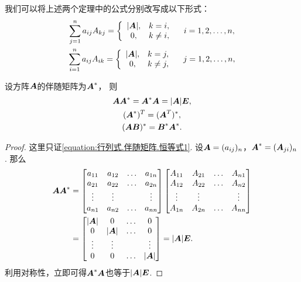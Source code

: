 我们可以将上述两个定理中的公式分别改写成以下形式：
\begin{gather}
	\sum_{j=1}^n a_{ij} A_{kj}
	= \left\{ \begin{array}{cl}
		\abs{\boldsymbol{A}}, & k = i, \\
		0, & k \neq i,
	\end{array} \right.
	\quad i=1,2,\dotsc,n, \\
	\sum_{i=1}^n a_{ij} A_{ik}
	= \left\{ \begin{array}{cl}
		\abs{\boldsymbol{A}}, & k = j, \\
		0, & k \neq j,
	\end{array} \right.
	\quad j=1,2,\dotsc,n,
\end{gather}

\begin{theorem}
设方阵\(\boldsymbol{A}\)的伴随矩阵为\(\boldsymbol{A}^*\)，
则\begin{gather}
	\boldsymbol{A} \boldsymbol{A}^* = \boldsymbol{A}^* \boldsymbol{A} = \abs{\boldsymbol{A}} \boldsymbol{E}, \label{equation:行列式.伴随矩阵.恒等式1} \\
	(\boldsymbol{A}^*)^T = (\boldsymbol{A}^T)^*, \label{equation:行列式.伴随矩阵.恒等式2} \\
	(\boldsymbol{A} \boldsymbol{B})^* = \boldsymbol{B}^* \boldsymbol{A}^*. \label{equation:行列式.伴随矩阵.恒等式3}
\end{gather}
\begin{proof}
这里只证\cref{equation:行列式.伴随矩阵.恒等式1}.
设\(\boldsymbol{A}=(a_{ij})_n\)，\(\boldsymbol{A}^*=(\boldsymbol{A}_{ji})_n\).
那么\begin{align*}
	\boldsymbol{A}\boldsymbol{A}^*
	&= \begin{bmatrix}
		a_{11} & a_{12} & \dots & a_{1n} \\
		a_{21} & a_{22} & \dots & a_{2n} \\
		\vdots & \vdots & & \vdots \\
		a_{n1} & a_{n2} & \dots & a_{nn} \\
	\end{bmatrix}
	\begin{bmatrix}
		A_{11} & A_{21} & \dots & A_{n1} \\
		A_{12} & A_{22} & \dots & A_{n2} \\
		\vdots & \vdots & & \vdots \\
		A_{1n} & A_{2n} & \dots & A_{nn}
	\end{bmatrix} \\
	&= \begin{bmatrix}
		\abs{\boldsymbol{A}} & 0 & \dots & 0 \\
		0 & \abs{\boldsymbol{A}} & \dots & 0 \\
		\vdots & \vdots & & \vdots \\
		0 & 0 & \dots & \abs{\boldsymbol{A}}
	\end{bmatrix}
	= \abs{\boldsymbol{A}} \boldsymbol{E}.
\end{align*}
利用对称性，立即可得\(\boldsymbol{A}^*\boldsymbol{A}\)也等于\(\abs{\boldsymbol{A}} \boldsymbol{E}\).
\end{proof}
\end{theorem}

